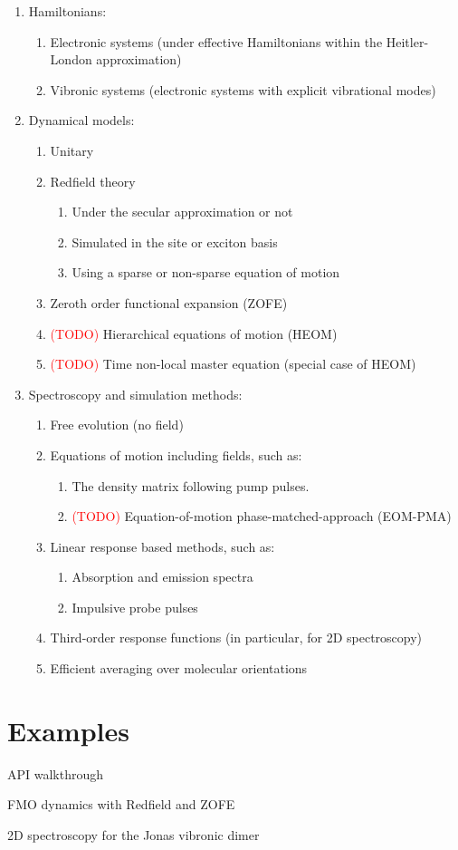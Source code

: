 \documentclass{article}
\begin{document}
\begin{enumerate}
	\item Hamiltonians:
	\begin{enumerate}
		\item Electronic systems (under effective Hamiltonians within the Heitler-London approximation)
      	\item Vibronic systems (electronic systems with explicit vibrational modes)
	\end{enumerate}
	\item Dynamical models:
	\begin{enumerate}
		\item Unitary
		\item Redfield theory
		\begin{enumerate}
			\item Under the secular approximation or not
			\item Simulated in the site or exciton basis
			\item Using a sparse or non-sparse equation of motion
		\end{enumerate}
		\item Zeroth order functional expansion (ZOFE)
		\item \textcolor{red}{(TODO)} Hierarchical equations of motion (HEOM)
	    \item \textcolor{red}{(TODO)} Time non-local master equation (special case of HEOM)
	\end{enumerate}
	\item Spectroscopy and simulation methods:
	\begin{enumerate}
		\item Free evolution (no field)
		\item Equations of motion including fields, such as:
		\begin{enumerate}
			\item The density matrix following pump pulses.
			\item \textcolor{red}{(TODO)} Equation-of-motion phase-matched-approach (EOM-PMA)
		\end{enumerate}
		\item Linear response based methods, such as:
		\begin{enumerate}
			\item Absorption and emission spectra
			\item Impulsive probe pulses
		\end{enumerate}
		\item Third-order response functions (in particular, for 2D spectroscopy)
		\item Efficient averaging over molecular orientations
	\end{enumerate}
\end{enumerate}

\section{Examples}

API walkthrough

FMO dynamics with Redfield and ZOFE

2D spectroscopy for the Jonas vibronic dimer
\end{document}
